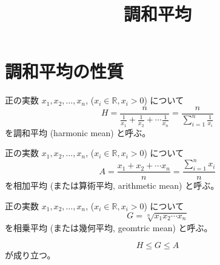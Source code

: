 \documentclass[12pt]{jsarticle}
\title{調和平均}
\begin{document}
\maketitle

\section{調和平均の性質}

\begin{definition}[調和平均]
正の実数 $x_1, x_2, \ldots, x_n$,
($x_i \in \mathbb{R}, x_i > 0$) について
\begin{equation}
H = \frac{n}{\frac{1}{x_1} + \frac{1}{x_2} + \cdots \frac{1}{x_n}}
= \frac{n}{\sum_{i=1}^{n} \frac{1}{x_i}}
\end{equation}
を調和平均 (harmonic mean) と呼ぶ。
\end{definition}

\begin{definition}[相加平均]
正の実数 $x_1, x_2, \ldots, x_n$,
($x_i \in \mathbb{R}, x_i > 0$) について
\begin{equation}
A = \frac{x_1 + x_2 + \cdots x_n}{n}
= \frac{\sum_{i=1}^{n} x_i}{n}
\end{equation}
を相加平均 (または算術平均, arithmetic mean) と呼ぶ。
\end{definition}

\begin{definition}[相乗平均]
正の実数 $x_1, x_2, \ldots, x_n$,
($x_i \in \mathbb{R}, x_i > 0$) について
\begin{equation}
G = \sqrt[n]{x_1 x_2 \cdots x_n}
\end{equation}
を相乗平均 (または幾何平均, geomtric mean) と呼ぶ。
\end{definition}

\begin{theorem}[平均の不等式]
\begin{equation}
H \le G \le A
\end{equation}
が成り立つ。
\end{theorem}
\end{document}
